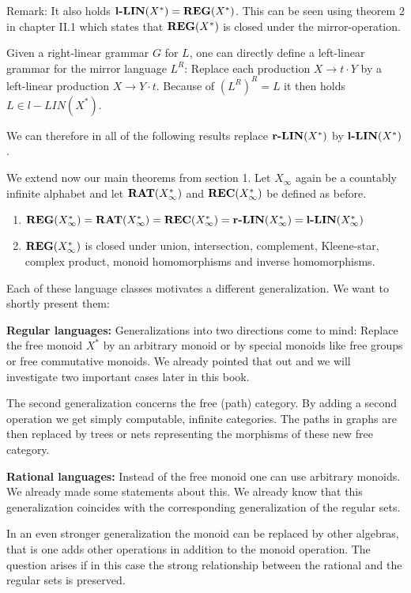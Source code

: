 Remark: It also holds $\mbox{{\bf l-LIN}}(X^*) = \mbox{{\bf REG}}(X^*)$. This can be seen using
theorem 2 in chapter II.1 which states that $\mbox{{\bf REG}}(X^*)$ is closed under the
mirror-operation.

Given a right-linear grammar $G$ for $L$, one can directly define a left-linear
grammar for the mirror language $L^R$: Replace each production $X \to t \cdot Y$
by a left-linear production $X \to Y \cdot t$. Because of $({L^R})^R = L$ it
then holds $L \in l{-}LIN(X^*)$.

We can therefore in all of the following results replace $\mbox{{\bf r-LIN}}(X^*)$ by
$\mbox{{\bf l-LIN}}(X^*)$.

\bigskip
We extend now our main theorems from section 1. Let $X_\infty$ again be a
countably infinite alphabet and let $\mbox{{\bf RAT}}(X_\infty^*)$ and 
$\mbox{{\bf REC}}(X_\infty^*)$ be defined as before.

\begin{maintheorem}\leavevmode
\begin{enumerate}
  \item $ \mbox{{\bf REG}}(X_\infty^*) = \mbox{{\bf RAT}}(X_\infty^*) = \mbox{{\bf REC}}(X_\infty^*) =
  \mbox{{\bf r-LIN}}(X_\infty^*) = \mbox{{\bf l-LIN}}(X_\infty^*)$
  \item $ \mbox{{\bf REG}}(X_\infty^*)$ is closed under union, intersection,
  complement, Kleene-star, complex product, monoid homomorphisms and inverse
  homomorphisms.
\end{enumerate}
\end{maintheorem}

Each of these language classes motivates a different generalization. We want to
shortly present them:

{\bf Regular languages:} Generalizations into two directions come to mind:
Replace the free monoid $X^*$ by an arbitrary monoid or by special monoids like
free groups or free commutative monoids. We already pointed that out and we will
investigate two important cases later in this book.

The second generalization concerns the free (path) category. By adding a second
operation we get simply computable, infinite categories. The paths in graphs are
then replaced by trees or nets representing the morphisms of these new free
category.

{\bf Rational languages:} Instead of the free monoid one can use arbitrary
monoids. We already made some statements about this. We already know that this
generalization coincides with the corresponding generalization of the regular
sets.

In an even stronger generalization the monoid can be replaced by other algebras,
that is one adds other operations in addition to the monoid operation. The
question arises if in this case the strong relationship between the rational
and the regular sets is preserved.

